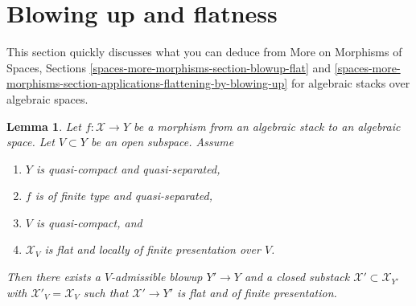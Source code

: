 \documentclass{stacks-project}
\theoremstyle{plain}
\newtheorem{lemma}[subsection]{Lemma}
\theoremstyle{definition}
\theoremstyle{remark}
\numberwithin{equation}{subsection}
\begin{document}
\section{Blowing up and flatness}
\label{section-blowup-flat}

\noindent
This section quickly discusses what you can deduce from
More on Morphisms of Spaces, Sections
\ref{spaces-more-morphisms-section-blowup-flat} and
\ref{spaces-more-morphisms-section-applications-flattening-by-blowing-up}
for algebraic stacks over algebraic spaces.

\begin{lemma}
\label{lemma-flatten-stack}
Let $f : \mathcal{X} \to Y$ be a morphism from an algebraic stack
to an algebraic space. Let $V \subset Y$ be an open subspace. Assume
\begin{enumerate}
\item $Y$ is quasi-compact and quasi-separated,
\item $f$ is of finite type and quasi-separated,
\item $V$ is quasi-compact, and
\item $\mathcal{X}_V$ is flat and locally of finite presentation over $V$.
\end{enumerate}
Then there exists a $V$-admissible blowup $Y' \to Y$
and a closed substack $\mathcal{X}' \subset \mathcal{X}_{Y'}$
with $\mathcal{X}'_V = \mathcal{X}_V$ such that
$\mathcal{X}' \to Y'$ is flat and of finite presentation.
\end{lemma}
\end{document}
